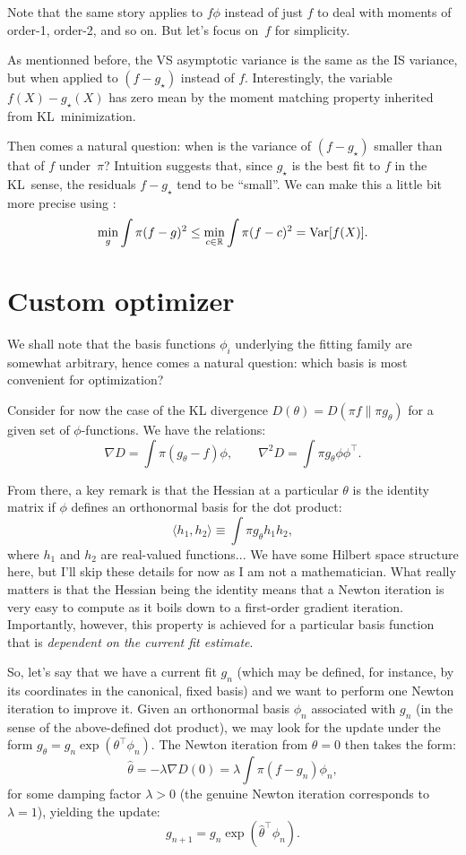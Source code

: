 \documentclass{article}
\begin{document}
Note that the same story applies to $f\phi$ instead of just $f$ to deal with moments of order-1, order-2, and so on. But let's focus on~$f$ for simplicity.

As mentionned before, the VS asymptotic variance is the same as the IS variance, but when applied to $(f-g_\star)$ instead of $f$. Interestingly, the variable $f(X)-g_\star(X)$ has zero mean by the moment matching property inherited from KL~minimization.

Then comes a natural question: when is the variance of $(f-g_\star)$ smaller than that of $f$ under~$\pi$? Intuition suggests that, since $g_\star$ is the best fit to $f$ in the KL~sense, the residuals $f-g_\star$ tend to be ``small''. We can make this a little bit more precise using :
$$
\min_g \int \pi (f-g)^2 \leq \min_{c\in\mathbb{R}} \int \pi (f-c)^2 = {\rm Var}[f(X)].
$$


\section{Custom optimizer}

We shall note that the basis functions $\phi_i$ underlying the fitting family are somewhat arbitrary, hence comes a natural question: which basis is most convenient for optimization?

Consider for now the case of the KL divergence $D(\theta)=D(\pi f\|\pi g_\theta)$ for a given set of $\phi$-functions. We have the relations:
$$
\nabla D = \int \pi (g_\theta-f) \phi,
\qquad
\nabla^2 D = \int \pi g_\theta \phi\phi^\top.
$$

From there, a key remark is that the Hessian at a particular $\theta$ is the identity matrix if $\phi$ defines an orthonormal basis for the dot product:
$$
\langle h_1, h_2 \rangle \equiv \int \pi g_{\theta} h_1 h_2,
$$
where $h_1$ and $h_2$ are real-valued functions... We have some Hilbert space structure here, but I'll skip these details for now as I am not a mathematician. What really matters is that the Hessian being the identity means that a Newton iteration is very easy to compute as it boils down to a first-order gradient iteration. Importantly, however, this property is achieved for a particular basis function that is {\em dependent on the current fit estimate}.

So, let's say that we have a current fit $g_n$ (which may be defined, for instance, by its coordinates in the canonical, fixed basis) and we want to perform one Newton iteration to improve it. Given an orthonormal basis $\phi_n$ associated with $g_n$ (in the sense of the above-defined dot product), we may look for the update under the form $g_\theta = g_n \exp({\theta^\top \phi_n})$. The Newton iteration from $\theta=0$ then takes the form:
$$
\hat{\theta} = -\lambda \nabla D(0) = \lambda \int \pi(f - g_n)\phi_n,
$$
for some damping factor $\lambda > 0$ (the genuine Newton iteration corresponds to $\lambda=1$), yielding the update:
$$
g_{n+1} = g_n \exp (\hat{\theta}^\top \phi_n).
$$
\end{document}
